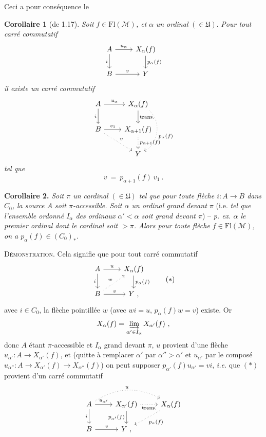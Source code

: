 \documentclass[11pt]{article}
\newcommand{\printedpage}[1]{\marginpar{\footnotesize p.~#1}}
\newcommand{\msp}[1]{\marginpar{\footnotesize [#1]}}
\newcommand{\Fl}{\mathrm{Fl}}
\newcommand{\cM}{\mathcal{M}}
\newcommand{\fU}{\mathfrak{U}}
\begin{document}
Ceci a pour conséquence le

\textbf{Corollaire 1} (de 1.17). \textit{Soit} $f \in \Fl(\cM)$\textit{, et} $\alpha$ \textit{un ordinal} $(\in \fU)$. \textit{Pour tout carré commutatif}
\[
\begin{tikzcd}
A \arrow[r, "u_\alpha"] \arrow[d, "i"'] & X_\alpha(f) \arrow[d, "p_\alpha(f)"] \\
B \arrow[r, "v"] & Y
\end{tikzcd}
\]
\printedpage{6}
\textit{il existe un carré commutatif}
\[
\begin{tikzcd}
A \arrow[r, "u_\alpha"] \arrow[d, "i"'] & X_\alpha(f) \arrow[d, "\text{trans.}"] \arrow[dd, dotted, bend left=60, "p_\alpha(f)"] \\
B \arrow[r, "v_1"] \arrow[dr, dotted, "v"] & X_{\alpha+1}(f) \arrow[d, dotted, "p_{\alpha+1}(f)"] \\
 & Y
\end{tikzcd}
\]
\textit{tel que}
\[
v \ = \ p_{\alpha+1}(f)\ v_1 \ .
\]

\msp{page 7}

\textbf{Corollaire 2.} \textit{Soit $\pi$ un cardinal} $(\in \fU)$ \textit{tel que pour toute flèche $i : A \longrightarrow B$ dans $C_0$, la source $A$ soit $\pi$-accessible. Soit $\alpha$ un ordinal grand devant $\pi$} (i.e. \textit{tel que l'ensemble ordonné $I_\alpha$ des ordinaux $\alpha' < \alpha$ soit grand devant $\pi$}) -- \textit{p. ex. $\alpha$ le premier ordinal dont le cardinal soit $> \pi$. Alors pour toute flèche $f \in \Fl(\cM)$, on a $p_\alpha(f) \in (C_0)_*$.}

\textsc{Démonstration}. Cela signifie que pour tout carré commutatif
\[
\begin{tikzcd}
A \arrow[r, "u"] \arrow[d, "i"'] & X_\alpha(f) \arrow[d, "p_\alpha(f)"] \\
B \arrow[r, "v"] \arrow[ur, dotted, "w"] & Y \ ,
\end{tikzcd}
\tag*{$(*)$}
\]
avec $i \in C_0$, la flèche pointillée $w$ (avec $wi = u$, $p_\alpha(f)w = v$) existe. Or
\[
X_\alpha(f) = \varinjlim_{\alpha' \in I_\alpha} X_{\alpha'}(f) \ ,
\]
donc $A$ étant $\pi$-accessible et $I_\alpha$ grand devant $\pi$, $u$ provient d'une flèche $u_{\alpha'} : A \longrightarrow X_{\alpha'}(f)$, et (quitte à remplacer $\alpha'$ par $\alpha'' > \alpha'$ et $u_{\alpha'}$ par le composé $u_{\alpha''} : A \longrightarrow X_{\alpha'}(f) \longrightarrow X_{\alpha''}(f)$) on peut supposer $p_{\alpha'}(f)u_{\alpha'} = vi$, \textit{i.e.} que $(*)$ provient d'un carré commutatif
\[
\begin{tikzcd}
A \arrow[r, "u_{\alpha'}"] \arrow[d, "i"'] \arrow[rr, dotted, bend left=30, "u"] & X_{\alpha'}(f) \arrow[r, dotted, "\text{trans.}"'] \arrow[d, "p_{\alpha'}(f)"'] & X_\alpha(f) \arrow[dl, dotted, "p_\alpha(f)"] \\
B \arrow[r, "v"] & Y \ , &
\end{tikzcd}
\]
\end{document}
